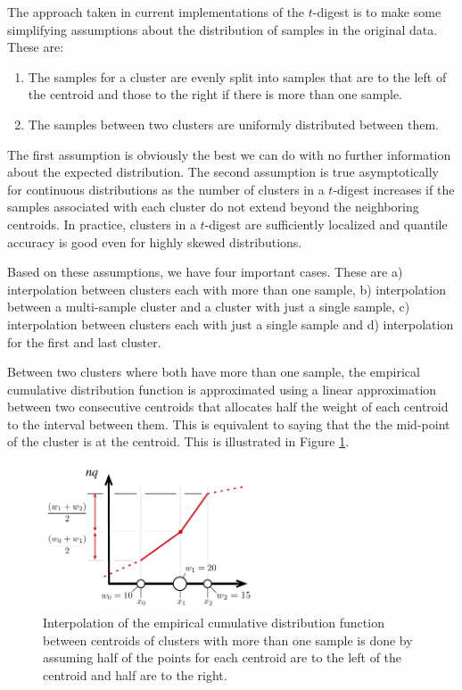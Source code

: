 \documentclass[]{statsoc}
\begin{document}
The approach taken in current implementations of the $t$-digest is to make some simplifying assumptions about the distribution of samples in the original data. These are:
\begin{enumerate}
\item The samples for a cluster are evenly split into samples that are to the left of the centroid and those to the right if there is more than one sample. 
\item The samples between two clusters are uniformly distributed between them. 
\end{enumerate}
The first assumption is obviously the best we can do with no further information about the expected distribution. The second assumption is true asymptotically for continuous distributions as the number of clusters in a $t$-digest increases if the samples associated with each cluster do not extend beyond the neighboring centroids. In practice, clusters in a $t$-digest are sufficiently localized and quantile accuracy is good even for highly skewed distributions.

Based on these assumptions, we have four important cases. These are a) interpolation between clusters each with more than one sample, b) interpolation between a multi-sample cluster and a cluster with just a single sample, c) interpolation between clusters each with just a single sample and d) interpolation for the first and last cluster.

Between two clusters where both have more than one sample, the empirical cumulative distribution function is approximated using a linear approximation between two consecutive centroids that allocates half the weight of each centroid to the interval between them. This is equivalent to saying that the the mid-point of the cluster is at the centroid. This is illustrated in Figure \ref{fig:interpolation}. 
\begin{figure}[htb] %
   \centering
   \includegraphics[width=3in]{figures/interpolation.pdf} 
   \caption{Interpolation of the empirical cumulative distribution function between centroids of clusters with more than one sample is done by assuming half of the points for each centroid are to the left of the centroid and half are to the right. }
   \label{fig:interpolation}
\end{figure}
\end{document}
